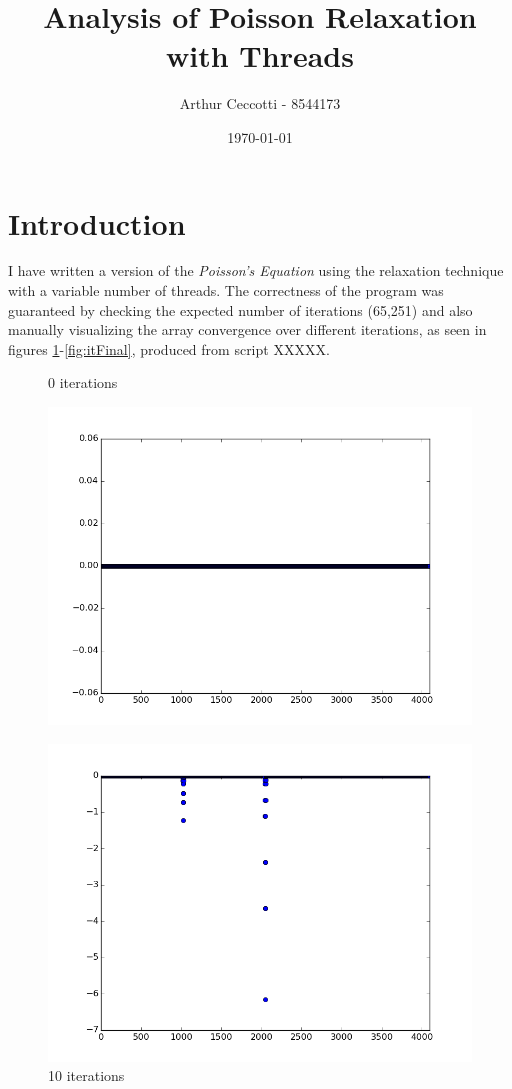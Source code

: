 \documentclass{article}
\title{Analysis of Poisson Relaxation with Threads}
\date{\today}
\author{Arthur Ceccotti - 8544173}
\begin{document}
\maketitle

\section{Introduction}
I have written a version of the \textit{Poisson's Equation} using the relaxation technique with a variable number of threads. The correctness of the program was guaranteed by checking the expected number of iterations (65,251) and also manually visualizing the array convergence over different iterations, as seen in figures \ref{fig:it0}-\ref{fig:itFinal}, produced from script XXXXX.
	
  \begin{figure}
  \centering
  \begin{minipage}{0.45\textwidth}
    \caption{0 iterations}
    \includegraphics[width=1\linewidth, natwidth=800, natheight=600]{graphs/it1.png}
    \label{fig:it0}
  \end{minipage}
  \begin{minipage}{0.45\textwidth}
    \caption{10 iterations}
    \includegraphics[width=1\linewidth, natwidth=800, natheight=600]{graphs/it10.png}

\end{minipage}
\end{figure}
\end{document}
